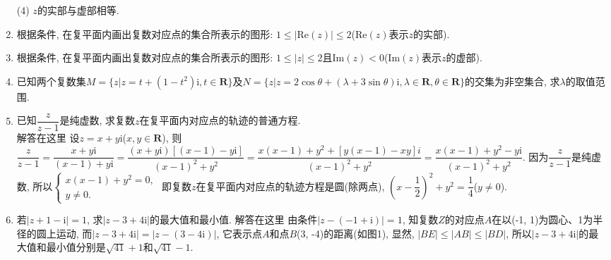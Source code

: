 \documentclass[10pt,a4paper]{article}
\begin{document}
\begin{enumerate}[1.]
(4) $z$的实部与虚部相等.
\item 根据条件, 在复平面内画出复数对应点的集合所表示的图形: $1\le|\mathrm{Re}(z)|\le 2$($\mathrm{Re}(z)$表示$z$的实部).
\item 根据条件, 在复平面内画出复数对应点的集合所表示的图形: $1\le|z|\le 2$且$\mathrm{Im}(z)<0$($\mathrm{Im}(z)$表示$z$的虚部).
\item 已知两个复数集$M=\{z|z=t+(1-t^2)\mathrm{i}, t\in \mathbf{R}\}$及$N=\{z|z=2\cos \theta +(\lambda +3\sin \theta)\mathrm{i},\lambda \in \mathbf{R},\theta \in \mathbf{R}\}$的交集为非空集合, 求$\lambda$的取值范围.
\item 已知$\dfrac z{z-1}$是纯虚数, 求复数$z$在复平面内对应点的轨迹的普通方程.\\
解答在这里  设$z=x+y\mathrm{i}$($x,y\in \mathbf{R}$),
则$\dfrac z{z-1}=\dfrac{x+y\mathrm{i}}{(x-1)+y\mathrm{i}}=\dfrac{(x+y\mathrm{i})[(x-1)-y\mathrm{i}]}{{{(x-1)}^2}+{y^2}}=\dfrac{x(x-1)+{y^2}+[y(x-1)-xy]i}{{{(x-1)}^2}+{y^2}}=\dfrac{x(x-1)+{y^2}-y\mathrm{i}}{{{(x-1)}^2}+{y^2}}$.
因为$\dfrac z{z-1}$是纯虚数, 所以$\begin{cases} x(x-1)+y^2=0, \\ y\ne 0. \end{cases}$
即复数$z$在复平面内对应点的轨迹方程是圆(除两点), $(x-\dfrac 12)^2+y^2=\dfrac 14$($y\ne 0$).
\item 若$|z+1-\mathrm{i}|=1$, 求$|z-3+4\mathrm{i}|$的最大值和最小值.
解答在这里  由条件$|z-(-1+\mathrm{i})|=1$, 知复数$Z$的对应点$A$在以(-1, 1)为圆心、1为半径的圆上运动, 而$|z-3+4\mathrm{i}|=|z-(3-4\mathrm{i})|$, 它表示点$A$和点$B$(3, -4)的距离(如图1), 显然, $|BE|\le|AB|\le|BD|$,
所以$|z-3+4\mathrm{i}|$的最大值和最小值分别是$\sqrt {41}+1$和$\sqrt {41}-1$.
\begin{center}
\end{center}
\end{enumerate}
\end{document}
